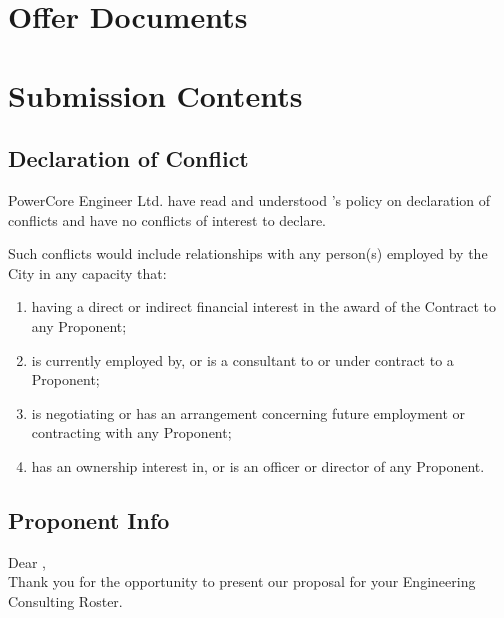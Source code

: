 \renewcommand\thesection{\Alph{section}}
\renewcommand\thesubsection{\thesection.\arabic{subsection}}
\renewcommand\thesubsubsection{\thesection.\thesubsection.\arabic{subsubsection}}

\section{Offer Documents}
\pagebreak

\section{Submission Contents}
\subsection{Declaration of Conflict}
\label{Sub:DOC}

PowerCore Engineer Ltd. have read and understood \Customer 's policy on declaration of conflicts and have no conflicts of interest to declare.

Such conflicts would include relationships with any person(s) employed by the City in any capacity that:

\begin{enumerate}
	\item having a direct or indirect financial interest in the award of the Contract to any Proponent;
	\item is currently employed by, or is a consultant to or under contract to a Proponent;
	\item is negotiating or has an arrangement concerning future employment or contracting with any Proponent;
	\item has an ownership interest in, or is an officer or director of any Proponent.
\end{enumerate}
\pagebreak

\subsection{Proponent Info}
\label{Sub:PI}

\noindent Dear \Customer, \\



\noindent Thank you for the opportunity to present our proposal for your Engineering Consulting Roster.\\



